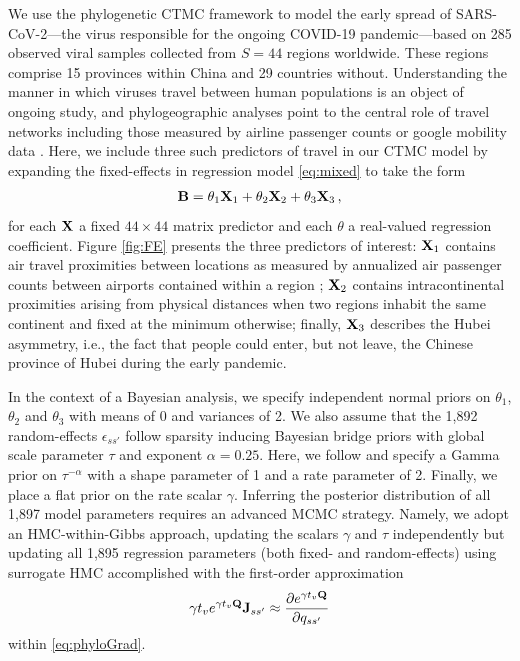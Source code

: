 \documentclass[12pt]{article} %
\begin{document}
We use the phylogenetic CTMC framework to model the early spread of SARS-CoV-2---the virus responsible for the ongoing COVID-19 pandemic---based on 285 observed viral samples collected from $S=44$ regions worldwide. These regions comprise 15 provinces within China and 29 countries without.  Understanding the manner in which viruses travel between human populations is an object of ongoing study, and phylogeographic analyses point to the central role of travel networks including those measured by airline passenger counts \citep{holbrook2021massive} or google mobility data \citep{worobey2020emergence}.  Here, we include three such predictors of travel in our CTMC model by expanding the fixed-effects in regression model \eqref{eq:mixed} to take the form
\begin{align*}
	\mathbf{B} = \theta_1 \mathbf{X}_1 + \theta_2  \mathbf{X}_2 + \theta_3 \mathbf{X}_3 \, ,
\end{align*} 
for each $\mathbf{X}$ a fixed $44\times 44$ matrix predictor and each $\theta$ a real-valued regression coefficient. Figure \ref{fig:FE} presents the three predictors of interest: $\mathbf{X}_1$ contains air travel proximities between locations as measured by annualized air passenger counts between airports contained within a region \citep{holbrook2021massive};  $\mathbf{X}_2$ contains intracontinental proximities arising from physical distances when two regions inhabit the same continent and fixed at the minimum otherwise; finally, $\mathbf{X}_3$ describes the Hubei asymmetry, i.e., the fact that people could enter, but not leave, the Chinese province of Hubei during the early pandemic.

In the context of a Bayesian analysis, we specify independent normal priors on $\theta_1$, $\theta_2$ and $\theta_3$ with means of 0 and variances of 2.  We also assume that the 1,892 random-effects $\epsilon_{ss'}$ follow sparsity inducing Bayesian bridge priors with global scale parameter $\tau$ and exponent $\alpha=0.25$.  Here, we follow \citet{nishimura2022shrinkage} and specify a Gamma prior on $\tau^{-\alpha}$ with a shape parameter of 1 and a rate parameter of 2. Finally, we place a flat prior on the rate scalar $\gamma$.  Inferring the posterior distribution of all 1,897 model parameters requires an advanced MCMC strategy. Namely, we adopt an HMC-within-Gibbs approach, updating the scalars $\gamma$ and $\tau$ independently but updating all 1,895 regression parameters (both fixed- and random-effects) using surrogate HMC accomplished with the first-order approximation
\begin{align*}
  \gamma t_v  e^{\gamma t_v \mathbf{Q}} \mathbf{J}_{ss'}    \approx \frac{\partial e^{\gamma t_v \mathbf{Q}}}{\partial q_{ss'}} 
\end{align*}
within \eqref{eq:phyloGrad}.
\end{document}
